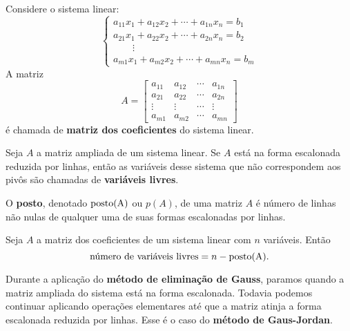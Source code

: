 Considere o sistema linear:
\begin{equation*}
    \begin{cases}
        a_{11}x_1 + a_{12}x_2 + \cdots + a_{1n}x_n = b_1\\
        a_{21}x_1 + a_{22}x_2 + \cdots + a_{2n}x_n = b_2\\
        \qquad \vdots\\
        a_{m1}x_1 + a_{m2}x_2 + \cdots + a_{mn}x_n = b_m
    \end{cases}
\end{equation*}
A matriz
\[
    A = \begin{bmatrix}
        a_{11} & a_{12} & \cdots & a_{1n}\\
        a_{21} & a_{22} & \cdots & a_{2n}\\
        \vdots & \vdots & \cdots & \vdots\\
        a_{m1} & a_{m2} & \cdots & a_{mn}
    \end{bmatrix}
\]
\'e chamada de \textbf{matriz dos coeficientes} do sistema linear.

\begin{definicao}
    Seja $A$ a matriz ampliada de um sistema linear. Se $A$ est\'a na forma escalonada reduzida por linhas, ent\~ao as vari\'aveis desse 
    sistema que n\~ao correspondem aos piv\^os s\~ao chamadas de \textbf{vari\'aveis livres}.
\end{definicao}

\begin{definicao}
    O \textbf{posto}, denotado $\mbox{\textrm{posto(A)}}$ ou $p(A)$, de uma matriz $A$ \'e n\'umero de linhas n\~ao nulas de qualquer 
    uma de suas formas escalonadas por linhas.
\end{definicao}

\begin{teorema}
    Seja $A$ a matriz dos coeficientes de um sistema linear com $n$ vari\'aveis. Ent\~ao
    \[
        \mbox{n\'umero de vari\'aveis livres} =  n - \mbox{\textrm{posto(A)}}.
    \]
\end{teorema}

Durante a aplica\c{c}\~ao do \textbf{m\'etodo de elimina\c{c}\~ao de Gauss}, paramos quando a matriz ampliada do sistema est\'a na forma escalonada.
Todavia podemos continuar aplicando opera\c{c}\~oes elementares at\'e que a matriz atinja a forma escalonada reduzida por linhas. Esse \'e o caso do 
\textbf{m\'etodo de Gaus-Jordan}.

